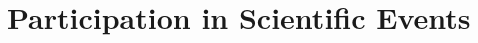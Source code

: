 \section*{Participation in Scientific Events}
\newcommand{\event}[4]{%
\item [#2] \begin{minipage}[t]{\linewidth} \textit{#1}\\%
        {\footnotesize#3}%
        \ifx&#4&
        \else%
        \\#4%
    \fi%
    \end{minipage}
}

